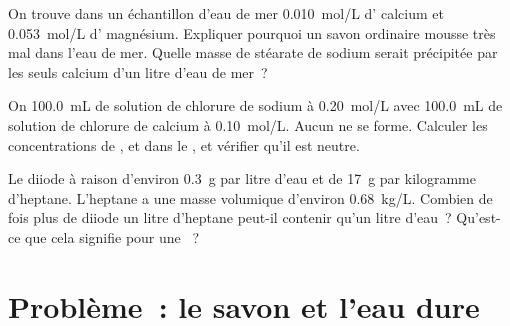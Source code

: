 \begin{exercise}[$\star\star\star$]\label{exo:g11:dissolution:13}
On trouve dans un échantillon d'eau de mer \qty{0.010}{mol/L} d'
calcium et \qty{0.053}{mol/L} d' magnésium. Expliquer pourquoi un
savon ordinaire mousse très mal dans l'eau de mer. Quelle masse de
stéarate de sodium serait précipitée par les seuls  calcium d'un
litre d'eau de mer~?
\end{exercise}

\begin{exercise}[$\star\star\star$]\label{exo:g11:dissolution:14}
On  \qty{100.0}{mL} de solution de chlorure de sodium à
\qty{0.20}{mol/L} avec \qty{100.0}{mL} de solution de chlorure de
calcium à \qty{0.10}{mol/L}. Aucun  ne se forme. Calculer les
concentrations de ,  et  dans le , et
vérifier qu'il est neutre.
\end{exercise}

\begin{exercise}[$\star\star\star$]\label{exo:g11:dissolution:15}
Le diiode  à raison d'environ \qty{0.3}{g} par litre d'eau et
de \qty{17}{g} par kilogramme d'heptane. L'heptane a une masse volumique
d'environ \qty{0.68}{kg/L}. Combien de fois plus de diiode un litre
d'heptane peut-il contenir qu'un litre d'eau~? Qu'est-ce que cela
signifie pour une ~?
\end{exercise}

\section{Problème~: le savon et l'eau dure}

